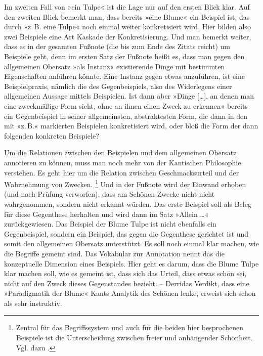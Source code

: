 \documentclass{article}
\renewcommand*{\see}{\autocap{v}gl\adddot}%
\begin{document}
Im zweiten Fall von »ein Tulpe« ist die Lage nur auf den ersten Blick
klar. Auf den zweiten Blick bemerkt man, dass bereits »eine Blume« ein
Beispiel ist, das durch »z.\,B. eine Tulpe« noch einmal weiter
konkretisiert wird. Hier bilden also zwei Beispiele eine Art Kaskade
der Konkretisierung. Und man bemerkt weiter, dass es in der gesamten
Fußnote (die bis zum Ende des Zitats reicht) um Beispiele geht, denn
im ersten Satz der Fußnote heißt es, dass man gegen den allgemeinen
Obersatz »als Instanz« existierende Dinge mit bestimmten Eigenschaften
anführen könnte. Eine Instanz gegen etwas anzuführen, ist eine
Beispielpraxis, nämlich die des Gegenbeispiels, also des Widerlegens
einer allgemeinen Aussage mittels Beispielen. Ist dann aber »Dinge
[…], an denen man eine zweckmäßige Form sieht, ohne an ihnen einen
Zweck zu erkennen« bereits ein Gegenbeispiel in seiner allgemeinsten,
abstraktesten Form, die dann in den mit »z.\,B.« markierten Beispielen
konkretisiert wird, oder bloß die Form der dann folgenden konkreten
Beispiele?

Um die Relationen zwischen den Beispielen und dem allgemeinen Obersatz
annotieren zu können, muss man noch mehr von der Kantischen
Philosophie verstehen. Es geht hier um die Relation zwischen
Geschmacksurteil und der Wahrnehmung von Zwecken.%
\footnote{Zentral für das Begriffssystem und auch für die beiden hier
  besprochenen Beispiele ist die Unterscheidung zwischen freier und
  anhängender Schönheit. Vgl. dazu \textcite{Guesken2018a}.} %
Und in der Fußnote wird der Einwand erhoben (und nach Prüfung
verworfen), dass am Schönen Zwecke nicht
nicht %
wahrgenommen, sondern nicht erkannt würden. Das erste Beispiel soll
als Beleg für diese Gegenthese herhalten und wird dann im Satz »Allein
…« zurückgewiesen. Das Beispiel der Blume Tulpe ist nicht ebenfalls
ein Gegenbeispiel, sondern ein Beispiel, das gegen die Gegenthese
gerichtet ist und somit den allgemeinen Obersatz unterstützt. Es soll
noch einmal klar machen, wie die Begriffe gemeint sind. Das Vokabular
zur Annotation nennt das die konzeptuelle Dimension eines
Beispiels. \Parencite[\see\ auch][]{CL2013b} Hier geht es darum, dass
die Blume Tulpe klar machen soll, wie es gemeint ist, dass sich das
Urteil, dass etwas schön sei, nicht auf den Zweck dieses Gegenstandes
bezieht. -- Derridas Verdikt, dass eine »Paradigmatik der Blume« Kants
Analytik des Schönen lenke, erweist sich schon als sehr instruktiv.
\end{document}
